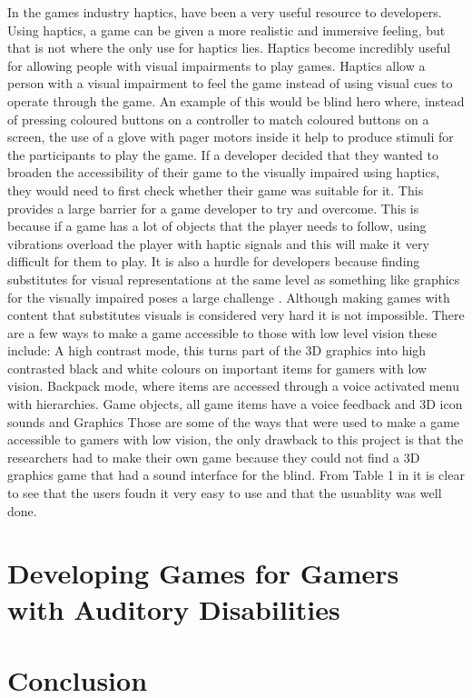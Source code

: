 \documentclass[11pt]{scrartcl}
\begin{document}
In the games industry haptics, have been a very useful resource to developers. Using haptics, a game can be given a more realistic and immersive feeling\cite{orozco2012role}, but that is not where the only use for haptics lies. 
Haptics become incredibly useful for allowing people with visual impairments to play games. Haptics allow a person with a visual impairment to feel the game instead of using visual cues to operate through the game. 
An example of this would be blind hero where, instead of pressing coloured buttons on a controller to match coloured buttons on a screen, the use of a glove with pager motors inside it help to produce stimuli for the participants to play the game.\cite{yuan2008blind}
If a developer decided that they wanted to broaden the accessibility of their game to the visually impaired using haptics, they would need to first check whether their game was suitable for it. This provides a large barrier for a game developer to try and overcome. This is because if a game has a lot of objects that the player needs to follow, using vibrations overload the player with haptic signals and this will make it very difficult for them to play\cite{orozco2012role}. 
It is also a hurdle for developers because finding substitutes for visual representations at the same level as something like graphics for the visually impaired poses a large challenge \cite{yuan2009towards}.
Although making games with content that substitutes visuals is considered very hard it is not impossible. There are a few ways to make a game accessible to those with low level vision these include:
A high contrast mode, this turns part of the 3D graphics into high contrasted black and white colours on important items for gamers with low vision.
Backpack mode, where items are accessed through a voice activated menu with hierarchies.
Game objects, all game items have a voice feedback and 3D icon sounds and Graphics \cite{westin2004game}
Those are some of the ways that were used to make a game accessible to gamers with low vision, the only drawback to this project is that the researchers had to make their own game because they could not find a 3D graphics game that had a sound interface for the blind. From Table 1 in \cite{westin2004game} it is clear to see that the users foudn it very easy to use and that the usuablity was well done.


\section{Developing Games for Gamers with Auditory Disabilities}



\section{}



\section{Conclusion}



\end{document}
